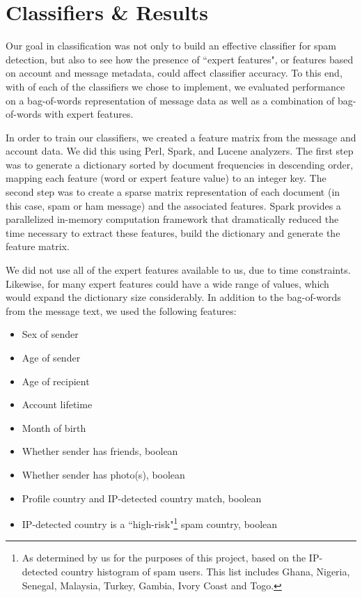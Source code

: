 \documentclass[preprint]{acm_proc_article-sp}
\begin{document}
\section{Classifiers \& Results}

Our goal in classification was not only to build an effective classifier for spam detection, 
but also to see how the presence of ``expert features", or features based on account and 
message metadata, could affect classifier accuracy. To this end, with of each of the classifiers 
we chose to implement, we evaluated performance on a bag-of-words representation of message data 
as well as a combination of bag-of-words with expert features.

In order to train our classifiers, we created a feature matrix from the message and account data. 
We did this using Perl, Spark, and Lucene analyzers. The first step was to generate a dictionary sorted by document 
frequencies in descending order, mapping each feature (word or expert feature value) to an integer 
key. The second step was to create a sparse matrix representation of each document (in this case, 
spam or ham message) and the associated features. Spark provides a parallelized in-memory computation 
framework that dramatically reduced the time necessary to extract these features, build the dictionary 
and generate the feature matrix. 

We did not use all of the expert features available to us, due to time constraints. Likewise, for 
many expert features could have a wide range of values, which would expand the dictionary size 
considerably. In addition to the bag-of-words from the message text, we used the following features:
\begin{itemize}
\item Sex of sender
\item Age of sender
\item Age of recipient
\item Account lifetime
\item Month of birth 
\item Whether sender has friends, boolean
\item Whether sender has photo(s), boolean
\item Profile country and IP-detected country match, boolean
\item IP-detected country is a ``high-risk"\footnote{As determined by us for the purposes of this project, based on 
the IP-detected country histogram of spam users. This list includes Ghana, Nigeria, Senegal, Malaysia, Turkey, 
Gambia, Ivory Coast and Togo.} spam country, boolean
\end{itemize}
\end{document}
